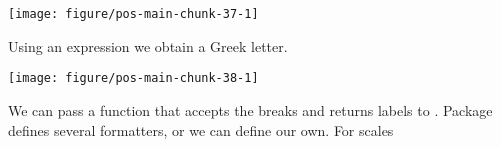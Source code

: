 \documentclass[krantz2]{krantz}\usepackage{knitr}%
\begin{document}
\begin{knitrout}\footnotesize
{}\color{fgcolor}\begin{kframe}
\begin{alltt}
  \hlopt{+}
  \hlstd{()} \hlopt{+}
  \hlstd{(} \hlstd{=} \hlstd{(}\hlstd{,} \hlstd{,} \hlstd{,} \hlstd{),}
                      \hlstd{=} \hlstd{(}\hlstd{,} \hlstd{,} \hlstd{,} \hlstd{))}
\end{alltt}
\end{kframe}

{\centering \texttt{[image: figure/pos-main-chunk-37-1]} 

}



\end{knitrout}

Using an expression we obtain a Greek letter.

\begin{knitrout}\footnotesize
{}\color{fgcolor}\begin{kframe}
\begin{alltt}
  \hlopt{+}
  \hlstd{()} \hlopt{+}
  \hlstd{(} \hlstd{=} \hlstd{(}\hlstd{,} \hlstd{,} \hlstd{,} \hlstd{),}
                      \hlstd{=} \hlstd{(}\hlstd{,} \hlstd{,}  \hlstd{))}
\end{alltt}
\end{kframe}

{\centering \texttt{[image: figure/pos-main-chunk-38-1]} 

}



\end{knitrout}

We can pass a function that accepts the breaks and returns labels to . Package \scales defines several formatters, or we can define our own. For  scales
\end{document}

